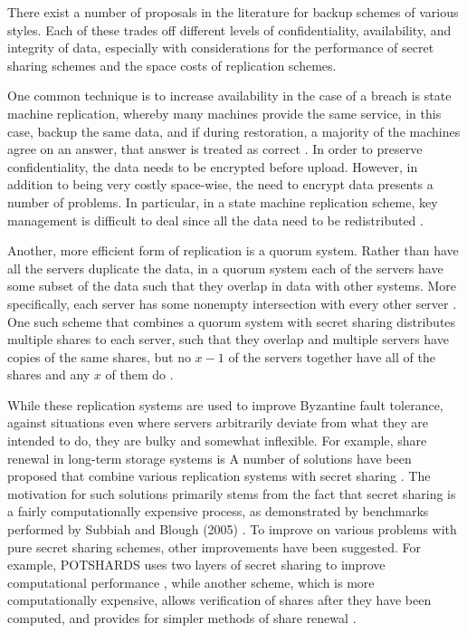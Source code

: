 \documentclass[letterpaper,twocolumn,10pt]{article}
\begin{document}
There exist a number of proposals in the literature for backup schemes of various styles. Each of these trades off different levels of confidentiality, availability, and integrity of data, especially with considerations for the performance of secret sharing schemes and the space costs of replication schemes.

One common technique is to increase availability in the case of a breach is state machine replication, whereby many machines provide the same service, in this case, backup the same data, and if during restoration, a majority of the machines agree on an answer, that answer is treated as correct \cite{schneider}. In order to preserve confidentiality, the data needs to be encrypted before upload. However, in addition to being very costly space-wise, the need to encrypt data presents a number of problems. In particular, in a state machine replication scheme, key management is difficult to deal since all the data need to be redistributed \cite{reiter}.

Another, more efficient form of replication is a quorum system. Rather than have all the servers duplicate the data, in a quorum system each of the servers have some subset of the data such that they overlap in data with other systems. More specifically, each server has some nonempty intersection with every other server \cite{naor}. One such scheme that combines a quorum system with secret sharing distributes multiple shares to each server, such that they overlap and multiple servers have copies of the same shares, but no $x - 1$ of the servers together have all of the shares and any $x$ of them do \cite{ito}.

While these replication systems are used to improve Byzantine fault tolerance, against situations even where servers arbitrarily deviate from what they are intended to do, they are bulky and somewhat inflexible. For example, share renewal in long-term storage systems is  A number of solutions have been proposed that combine various replication systems with secret sharing \cite{subbiah, lakshmanan}. The motivation for such solutions primarily stems from the fact that secret sharing is a fairly computationally expensive process, as demonstrated by benchmarks performed by Subbiah and Blough (2005) \cite{subbiah}. To improve on various problems with pure secret sharing schemes, other improvements have been suggested. For example, POTSHARDS uses two layers of secret sharing to improve computational performance \cite{greenan}, while another scheme, which is more computationally expensive, allows verification of shares after they have been computed, and provides for simpler methods of share renewal \cite{chor}.
\end{document}
